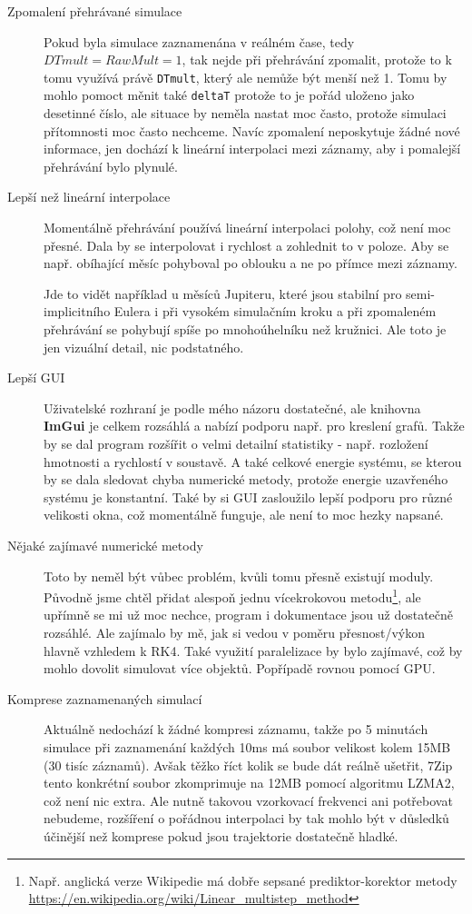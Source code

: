 \begin{description}
	\item[Zpomalení přehrávané simulace] Pokud byla simulace zaznamenána v reálném čase, tedy $ DTmult=RawMult=1 $, tak nejde při přehrávání zpomalit, protože to k tomu využívá právě \texttt{DTmult}, který ale nemůže být menší než 1. Tomu by mohlo pomoct měnit také \texttt{deltaT} protože to je pořád uloženo jako desetinné číslo, ale situace by neměla nastat moc často, protože simulaci přítomnosti moc často nechceme. Navíc zpomalení neposkytuje žádné nové informace, jen dochází k lineární interpolaci mezi záznamy, aby i pomalejší přehrávání bylo plynulé.
	
	\item[Lepší než lineární interpolace] Momentálně přehrávání používá lineární interpolaci polohy, což není moc přesné. Dala by se interpolovat i rychlost a zohlednit to v poloze. Aby se např. obíhající měsíc pohyboval po oblouku a ne po přímce mezi záznamy.
	
	Jde to vidět například u měsíců Jupiteru, které jsou stabilní pro semi-implicitního Eulera i při vysokém simulačním kroku a při zpomaleném přehrávání se pohybují spíše po mnohoúhelníku než kružnici. Ale toto je jen vizuální detail, nic podstatného.
	
	\item[Lepší GUI] Uživatelské rozhraní je podle mého názoru dostatečné, ale knihovna \textbf{ImGui} je celkem rozsáhlá a nabízí podporu např. pro kreslení grafů. Takže by se dal program rozšířit o velmi detailní statistiky - např. rozložení hmotnosti a rychlostí v soustavě. A také celkové energie systému, se kterou by se dala sledovat chyba numerické metody, protože energie uzavřeného systému je konstantní. Také by si GUI zasloužilo lepší podporu pro různé velikosti okna, což momentálně funguje, ale není to moc hezky napsané.
	
	\item[Nějaké zajímavé numerické metody] Toto by neměl být vůbec problém, kvůli tomu přesně existují moduly. Původně jsme chtěl přidat alespoň jednu vícekrokovou metodu\footnote{Např. anglická verze Wikipedie má dobře sepsané prediktor-korektor metody \url{https://en.wikipedia.org/wiki/Linear_multistep_method}}, ale upřímně se mi už moc nechce, program i dokumentace jsou už dostatečně rozsáhlé. Ale zajímalo by mě, jak si vedou v poměru přesnost/výkon hlavně vzhledem k RK4.
	Také využití paralelizace by bylo zajímavé, což by mohlo dovolit simulovat více objektů. Popřípadě rovnou pomocí GPU.
	
	\item[Komprese zaznamenaných simulací] Aktuálně nedochází k žádné kompresi záznamu, takže po 5 minutách simulace při zaznamenání každých 10ms má soubor velikost kolem 15MB (30 tisíc záznamů). Avšak těžko říct kolik se bude dát reálně ušetřit, 7Zip tento konkrétní soubor zkomprimuje na 12MB pomocí algoritmu LZMA2, což není nic extra. Ale nutně takovou vzorkovací frekvenci ani potřebovat nebudeme, rozšíření o pořádnou interpolaci by tak mohlo být v důsledků účinější než komprese pokud jsou trajektorie dostatečně hladké.
	

\end{description}
